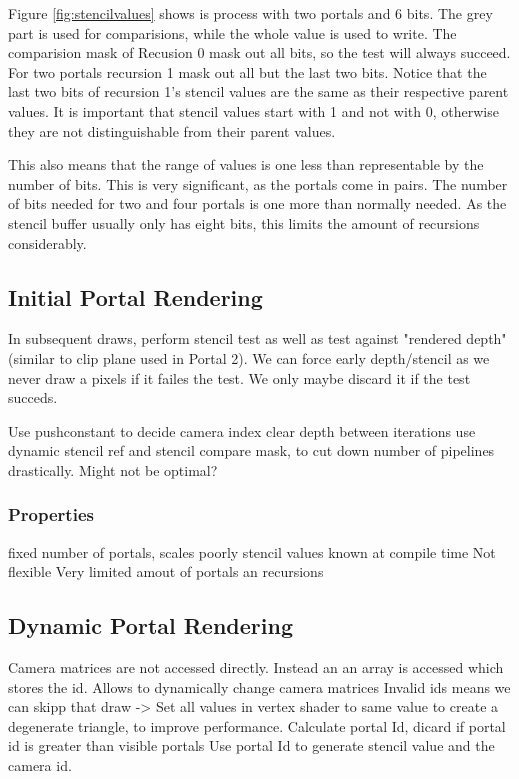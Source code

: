 Figure \ref{fig:stencilvalues} shows is process with two portals and 6 bits. The grey part is used for comparisions, while the whole value is used to write. The comparision mask of Recusion 0 mask out all bits, so the test will always succeed. For two portals recursion 1 mask out all but the last two bits. Notice that the last two bits of  recursion 1's stencil values are the same as their respective parent values. It is important that stencil values start with 1 and not with 0, otherwise they are not distinguishable from their parent values.

This also means that the range of values is one less than representable by the number of bits. This is very significant, as the portals come in pairs. The number of bits needed for two and four portals is one more than normally needed. As the stencil buffer usually only has eight bits, this limits the amount of recursions considerably.







\subsection{Initial Portal Rendering}
In subsequent draws, perform stencil test as well as test against "rendered depth" (similar to clip plane used in Portal 2).
We can force early depth/stencil as we never draw a pixels if it failes the test. We only maybe discard it if the test succeds.

Use pushconstant to decide camera index
clear depth between iterations
use dynamic stencil ref and stencil compare mask, to cut down number of pipelines drastically. Might not be optimal?


\subsubsection{Properties}
fixed number of portals, scales poorly
stencil values known at compile time
Not flexible
Very limited amout of portals an recursions

\subsection{Dynamic Portal Rendering}
Camera matrices are not accessed directly. Instead an an array is accessed which stores the id. Allows to dynamically change camera matrices
Invalid ids means we can skipp that draw -> Set all values in vertex shader to same value to create a degenerate triangle, to improve performance.
Calculate portal Id, dicard if portal id is greater than visible portals
Use portal Id to generate stencil value and the camera id.


